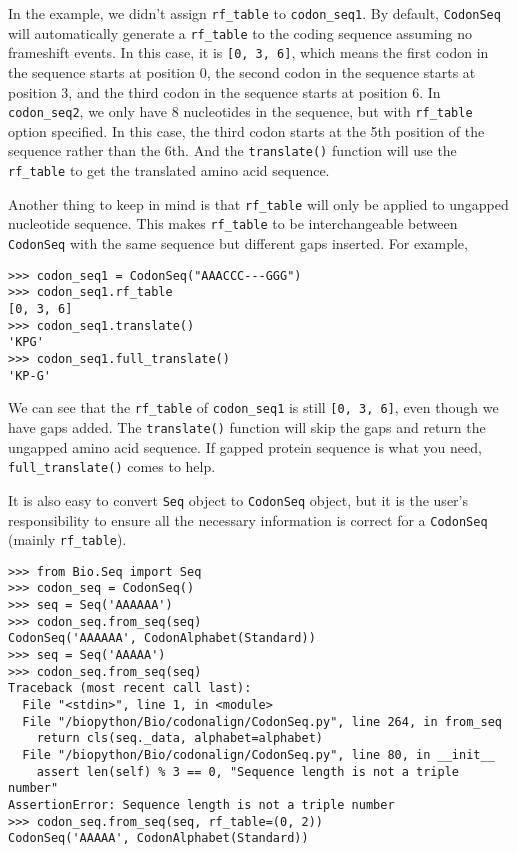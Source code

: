 In the example, we didn't assign \texttt{rf\_table} to
\texttt{codon\_seq1}. By default, \verb|CodonSeq| will automatically
generate a \texttt{rf\_table} to the coding sequence assuming no
frameshift events. In this case, it is \texttt{{[}0, 3, 6{]}}, which
means the first codon in the sequence starts at position 0, the second
codon in the sequence starts at position 3, and the third codon in the
sequence starts at position 6. In \texttt{codon\_seq2}, we only have 8
nucleotides in the sequence, but with \texttt{rf\_table} option
specified. In this case, the third codon starts at the 5th position of
the sequence rather than the 6th. And the \texttt{translate()} function
will use the \texttt{rf\_table} to get the translated amino acid
sequence.

Another thing to keep in mind is that \texttt{rf\_table} will only be
applied to ungapped nucleotide sequence. This makes \texttt{rf\_table}
to be interchangeable between \verb|CodonSeq| with the same sequence
but different gaps inserted. For example,

\begin{verbatim}
>>> codon_seq1 = CodonSeq("AAACCC---GGG")
>>> codon_seq1.rf_table
[0, 3, 6]
>>> codon_seq1.translate()
'KPG'
>>> codon_seq1.full_translate()
'KP-G'
\end{verbatim}

We can see that the \texttt{rf\_table} of \texttt{codon\_seq1} is still
\texttt{{[}0, 3, 6{]}}, even though we have gaps added. The
\verb|translate()| function will skip the gaps and return the ungapped
amino acid sequence. If gapped protein sequence is what you need,
\verb|full_translate()| comes to help.

It is also easy to convert \verb|Seq| object to \verb|CodonSeq|
object, but it is the user's responsibility to ensure all the necessary
information is correct for a \verb|CodonSeq| (mainly \texttt{rf\_table}).

\begin{verbatim}
>>> from Bio.Seq import Seq
>>> codon_seq = CodonSeq()
>>> seq = Seq('AAAAAA')
>>> codon_seq.from_seq(seq)
CodonSeq('AAAAAA', CodonAlphabet(Standard))
>>> seq = Seq('AAAAA')
>>> codon_seq.from_seq(seq)
Traceback (most recent call last):
  File "<stdin>", line 1, in <module>
  File "/biopython/Bio/codonalign/CodonSeq.py", line 264, in from_seq
    return cls(seq._data, alphabet=alphabet)
  File "/biopython/Bio/codonalign/CodonSeq.py", line 80, in __init__
    assert len(self) % 3 == 0, "Sequence length is not a triple number"
AssertionError: Sequence length is not a triple number
>>> codon_seq.from_seq(seq, rf_table=(0, 2))
CodonSeq('AAAAA', CodonAlphabet(Standard))
\end{verbatim}

